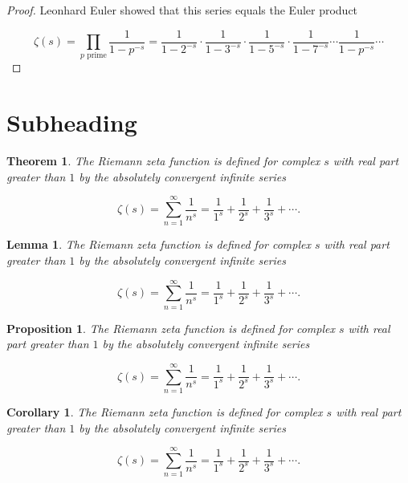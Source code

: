 \documentclass[english,oneside, article]{memoir}
\theoremstyle{plain}
\newtheorem{Theorem}{Theorem}[chapter]
\newtheorem*{Lemma}{Lemma}
\newtheorem*{Proposition}{Proposition}
\newtheorem*{Corollary}{Corollary}
\theoremstyle{definition}
\theoremstyle{remark}
\begin{document}
\begin{proof}

Leonhard Euler showed that this series equals the Euler product

\[\zeta(s) = \prod_{p \text{ prime}} \frac{1}{1-p^{-s}}= \frac{1}{1-2^{-s}}\cdot\frac{1}{1-3^{-s}}\cdot\frac{1}{1-5^{-s}}\cdot\frac{1}{1-7^{-s}} \cdots \frac{1}{1-p^{-s}} \cdots\]

\end{proof}

\section{Subheading}\label{subheading}

\begin{Theorem}

The Riemann zeta function is defined for complex \(s\) with real part
greater than \(1\) by the absolutely convergent infinite series

\[\zeta(s) = \sum_{n=1}^\infty \frac{1}{n^s} = \frac{1}{1^s} + \frac{1}{2^s} + \frac{1}{3^s} + \cdots.\]

\end{Theorem}

\begin{Lemma}

The Riemann zeta function is defined for complex \(s\) with real part
greater than \(1\) by the absolutely convergent infinite series

\[\zeta(s) = \sum_{n=1}^\infty \frac{1}{n^s} = \frac{1}{1^s} + \frac{1}{2^s} + \frac{1}{3^s} + \cdots.\]

\end{Lemma}

\begin{Proposition}

The Riemann zeta function is defined for complex \(s\) with real part
greater than \(1\) by the absolutely convergent infinite series

\[\zeta(s) = \sum_{n=1}^\infty \frac{1}{n^s} = \frac{1}{1^s} + \frac{1}{2^s} + \frac{1}{3^s} + \cdots.\]

\end{Proposition}

\begin{Corollary}

The Riemann zeta function is defined for complex \(s\) with real part
greater than \(1\) by the absolutely convergent infinite series

\[\zeta(s) = \sum_{n=1}^\infty \frac{1}{n^s} = \frac{1}{1^s} + \frac{1}{2^s} + \frac{1}{3^s} + \cdots.\]

\end{Corollary}
\end{document}
